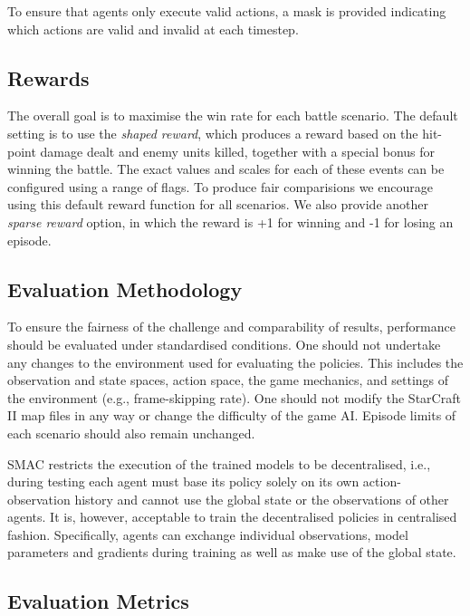 \documentclass[twoside,11pt]{article}
\begin{document}
To ensure that agents only execute valid actions, a mask is provided indicating which actions are valid and invalid at each timestep.

\subsection{Rewards}

The overall goal is to maximise the win rate for each battle scenario.
The default setting is to use the \textit{shaped reward}, which produces a reward based on the hit-point damage dealt and enemy units killed, together with a special bonus for winning the battle.
The exact values and scales for each of these events can be configured using a range of flags. 
To produce fair comparisions we encourage using this default reward function for all scenarios.
We also provide another \textit{sparse reward} option, in which the reward is +1 for winning and -1 for losing an episode.



\subsection{Evaluation Methodology}
To ensure the fairness of the challenge and comparability of results, performance should be evaluated under standardised conditions. 
One should not undertake any changes to the environment used for evaluating the policies. 
This includes the observation and state spaces, action space, the game mechanics, and settings of the environment (e.g., frame-skipping rate).
One should not modify the StarCraft II map files in any way or change the difficulty of the game AI. Episode limits of each scenario should also remain unchanged. 

SMAC restricts the execution of the trained models to be decentralised, i.e., during testing each agent must base its policy solely on its own action-observation history and cannot use the global state or the observations of other agents. It is, however, acceptable to train the decentralised policies in centralised fashion. Specifically, agents can exchange individual observations, model parameters and gradients during training as well as make use of the global state. 

\subsection{Evaluation Metrics}
\end{document}
